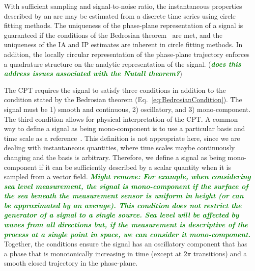 \documentclass[a4paper]{IEEEtran}
\newcommand{\dean}[1]{\textsf{\emph{\textbf{\textcolor{green}{#1}}}}}
\begin{document}
With sufficient sampling and signal-to-noise ratio, the instantaneous properties described by an arc may be estimated from a discrete time series using circle fitting methods. The uniqueness of the phase-plane representation of a signal is guaranteed if the conditions of the Bedrosian theorem~\cite{Bedrosian1963} are met, and the uniqueness of the IA and IP estimates are inherent in circle fitting methods. In addition, the locally circular representation of the phase-plane trajectory enforces a quadrature structure on the analytic representation of the signal. (\dean{does this address issues associated with the Nutall theorem?})

The CPT requires the signal to satisfy three conditions in addition to the condition stated by the Bedrosian theorem (Eq.~\ref{eq:BedrosianCondition}). The signal must be 1) smooth and continuous, 2) oscillatory, and 3) mono-component. The third condition allows for physical interpretation of the CPT. A common way to define a signal as being mono-component is to use a particular basis and time scale as a reference~\cite{Boashash1992,Cohen1995}. This definition is not appropriate here, since we are dealing with instantaneous quantities, where time scales maybe continuously changing and the basis is arbitrary. Therefore, we define a signal as being mono-component if it can be sufficiently described by a scalar quantity when it is sampled from a vector field. \dean{Might remove: For example, when considering sea level measurement, the signal is mono-component if the surface of the sea beneath the measurement sensor is uniform in height (or can be approximated by an average). This condition does not restrict the generator of a signal to a single source. Sea level will be affected by waves from all directions but, if the measurement is descriptive of the process at a single point in space, we can consider it mono-component.} Together, the conditions ensure the signal has an oscillatory component that has a phase that is monotonically increasing in time (except at $2\pi$ transitions) and a smooth closed trajectory in the phase-plane. 
\end{document}
